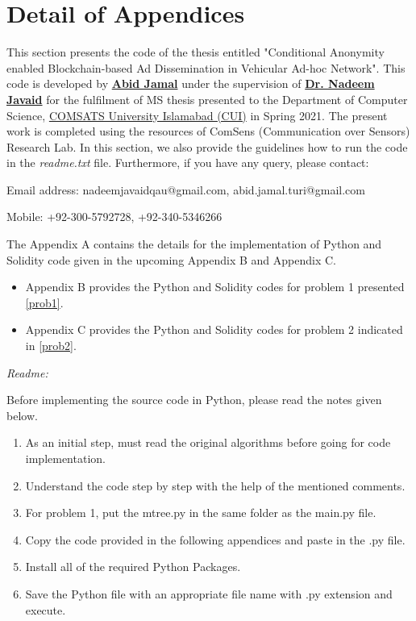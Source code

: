 \section{Detail of Appendices}
This section presents the code of the thesis entitled "Conditional Anonymity enabled Blockchain-based Ad Dissemination in Vehicular Ad-hoc Network".
This code is developed by {\href{https://sites.google.com/view/abidjamal/home?authuser=2}{\textbf{Abid Jamal}}} under the supervision of {\href{www.njavaid.com}{\textbf{Dr. Nadeem Javaid}}} for the fulfilment of MS thesis presented to the Department of Computer Science, {\href{https://www.comsats.edu.pk/}{COMSATS University Islamabad (CUI)}} in Spring 2021. The present work is completed using the resources of ComSens (Communication over Sensors) Research Lab. In this section, we also provide the guidelines how to run the code in the \textit{readme.txt} file. Furthermore, if you have any query, please contact:\par
Email address: nadeemjavaidqau@gmail.com, abid.jamal.turi@gmail.com\par
Mobile: +92-300-5792728, +92-340-5346266\par
The Appendix A contains the details for the implementation of Python and Solidity code given in the upcoming Appendix B and Appendix C.\par
\begin{itemize}
  \item Appendix B provides the Python and Solidity codes for problem 1 presented \ref{prob1}.
  \item Appendix C provides the Python and Solidity codes for problem 2 indicated in \ref{prob2}.
\end{itemize}
\textit{Readme:}\par
  Before implementing the source code in Python, please read the notes given below.
\begin{enumerate}
  \item As an initial step, must read the original algorithms before going for code implementation.
  \item Understand the code step by step with the help of the mentioned comments.
  \item For problem 1, put the mtree.py in the same folder as the main.py file.
  \item Copy the code provided in the following appendices and paste in the .py file.
  \item Install all of the required Python Packages.
  \item Save the Python file with an appropriate file name with .py extension and execute.
\end{enumerate} 